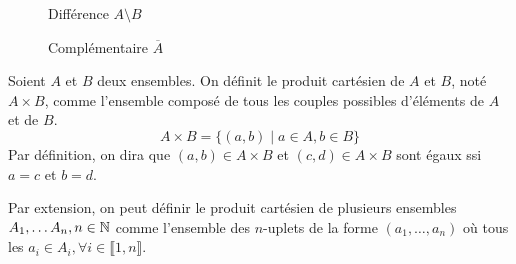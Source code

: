 \begin{figure}[h!]
    \centering
    \begin{minipage}{0.45\linewidth}
        \centering
        \caption{Différence $A \setminus B$}
    \end{minipage}\hfill
    \begin{minipage}{0.45\linewidth}
        \centering
        \caption{Complémentaire $\overline{A}$}
        \end{minipage}
\end{figure}

\begin{definition}
    Soient $A$ et $B$ deux ensembles. On définit le produit cartésien de $A$ et $B$, noté $A \times B$, 
    comme l'ensemble composé de tous les couples possibles d'éléments de $A$ et de $B$. 
        \[ A \times B = \{(a,b) \; | \; a \in A, b \in B\} \] 
    Par définition, on dira que $(a,b) \in A \times B$ et $(c,d) \in A \times B$ sont égaux ssi 
    $a = c$ et $b = d$. 
\end{definition}

Par extension, on peut définir le produit cartésien de plusieurs ensembles $A_1, \dots A_n, n \in \mathbb{N}$ 
comme l'ensemble des $n$-uplets de la forme $(a_1, \dots, a_n)$ où tous les $a_i \in A_i, \forall i \in \llbracket 1, n \rrbracket$. 

